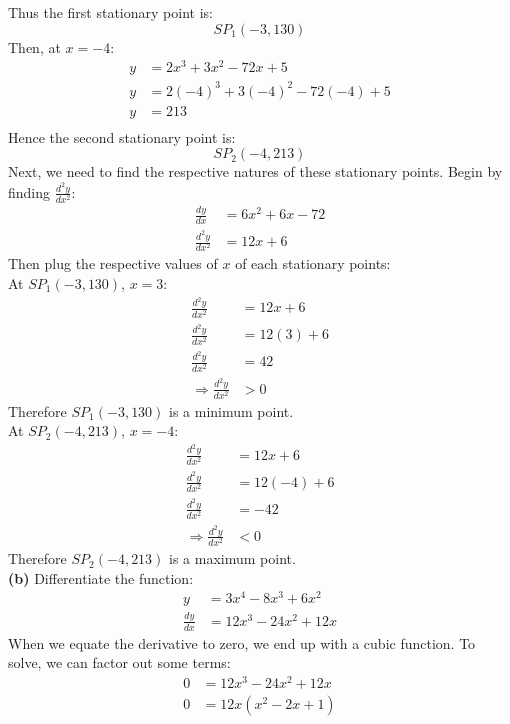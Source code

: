 \documentclass[hidelinks, a4paper, 12pt]{article}
\newcommand{\bd}{\textbf}
\newcommand{\n}{\\[\baselineskip]}
\newcommand{\thus}{\Rightarrow}
\newcommand{\dydx}{\frac{dy}{dx}}
\newcommand{\dydxx}{\frac{d^2y}{dx^2}}
\begin{document}
                Thus the first stationary point is:
                \[SP_1(-3, 130)\]
                Then, at $x=-4$:
                \[\begin{split}
                    y &= 2x^3 + 3x^2 - 72x + 5\\
                    y &= 2(-4)^3 + 3(-4)^2 - 72(-4) + 5\\
                    y &= 213\\
                \end{split}\]
                Hence the second stationary point is:
                \[SP_2(-4, 213)\]
                Next, we need to find the respective natures of these stationary points. Begin by finding $\dydxx$:
                \[\begin{split}
                    \dydx &= 6x^2 + 6x - 72\\
                    \dydxx &= 12x + 6
                \end{split}\]
                Then plug the respective values of $x$ of each stationary points:\n
                At $SP_1(-3,130)$, $x=3$:
                \[\begin{split}
                    \dydxx &= 12x + 6\\
                    \dydxx &= 12(3) + 6\\
                    \dydxx &= 42\\
                    \thus \dydxx &> 0
                \end{split}\]
                Therefore $SP_1(-3,130)$ is a minimum point.\n
                At $SP_2(-4,213)$, $x=-4$:
                \[\begin{split}
                    \dydxx &= 12x + 6\\
                    \dydxx &= 12(-4) + 6\\
                    \dydxx &= -42\\
                    \thus \dydxx &< 0
                \end{split}\]
                Therefore $SP_2(-4,213)$ is a maximum point.\n
                \bd{(b)} Differentiate the function:
                \[\begin{split}
                    y &= 3x^4 - 8x^3 + 6x^2\\
                    \dydx &= 12x^3 - 24x^2 + 12x
                \end{split}\]
                When we equate the derivative to zero, we end up with a cubic function. To solve, we can factor out some terms:
                \[\begin{split}
                    0 &= 12x^3 - 24x^2 + 12x\\
                    0 &= 12x(x^2 - 2x + 1)
                \end{split}\]
\end{document}
